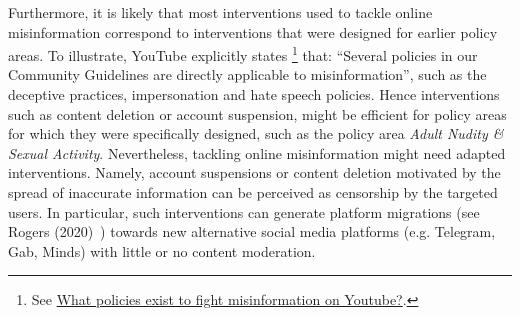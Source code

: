 \documentclass{article}
\begin{document}
Furthermore, it is likely that most interventions used to tackle online misinformation correspond to interventions that were designed for earlier policy areas.
To illustrate, YouTube explicitly states
\footnote{See \href{https://www.youtube.com/intl/en\_us/howyoutubeworks/our-commitments/fighting-misinformation/\#policies}{What policies exist to fight misinformation on Youtube?}.}
that: ``Several policies in our Community Guidelines are directly applicable to misinformation'', such as the deceptive practices, impersonation and hate speech policies.
Hence interventions such as content deletion or account suspension, might be efficient for policy areas for which they were specifically designed, such as the policy area {\it Adult Nudity \& Sexual Activity}. Nevertheless, tackling online misinformation might need adapted interventions.
Namely, account suspensions or content deletion motivated by the spread of inaccurate information can be perceived as censorship by the targeted users. In particular, such interventions can generate platform migrations (see Rogers (2020)~\cite{rogers2020}) towards new alternative social media platforms (e.g. Telegram, Gab, Minds) with little or no content moderation.

\smallskip
\end{document}
